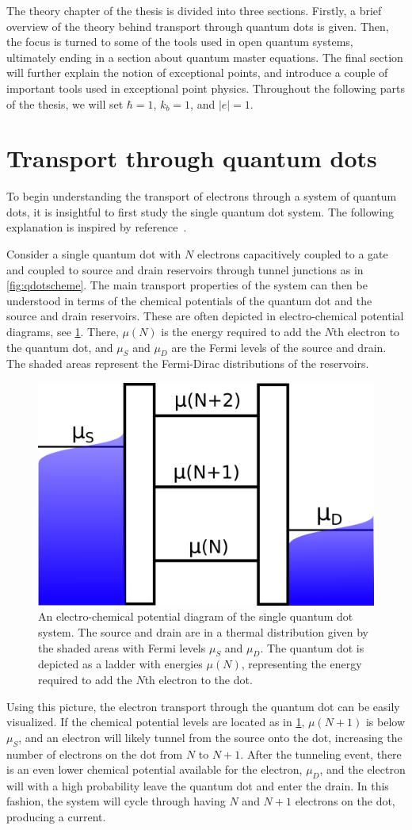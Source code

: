 \documentclass[../main.tex]{subfiles}
\begin{document}
The theory chapter of the thesis is divided into three sections. Firstly, a brief overview of the theory behind transport through quantum dots is given. Then, the focus is turned to some of the tools used in open quantum systems, ultimately ending in a section about quantum master equations. The final section will further explain the notion of exceptional points, and introduce a couple of important tools used in exceptional point physics. Throughout the following parts of the thesis, we will set $\hbar=1$, $k_b=1$, and $|e|=1$.

\section{Transport through quantum dots}
To begin understanding the transport of electrons through a system of quantum dots, it is insightful to first study the single quantum dot system. The following explanation is inspired by reference~\cite{transport}.

Consider a single quantum dot with $N$ electrons capacitively coupled to a gate and coupled to source and drain reservoirs through tunnel junctions as in \cref{fig:qdotscheme}. The main transport properties of the system can then be understood in terms of the chemical potentials of the quantum dot and the source and drain reservoirs. These are often depicted in electro-chemical potential diagrams, see \cref{fig:ladder}. There, $\mu(N)$ is the energy required to add the $N$th electron to the quantum dot, and $\mu_S$ and $\mu_D$ are the Fermi levels of the source and drain. The shaded areas represent the Fermi-Dirac distributions of the reservoirs.
\begin{figure}[H]
    \centering
    \includegraphics[width=0.5\linewidth]{figures/ladder.png}
    \caption{An electro-chemical potential diagram of the single quantum dot system. The source and drain are in a thermal distribution given by the shaded areas with Fermi levels $\mu_S$ and $\mu_D$. The quantum dot is depicted as a ladder with energies $\mu(N)$, representing the energy required to add the $N$th electron to the dot.}
    \label{fig:ladder}
\end{figure}
Using this picture, the electron transport through the quantum dot can be easily visualized. If the chemical potential levels are located as in \cref{fig:ladder}, $\mu(N + 1)$ is below $\mu_S$, and an electron will likely tunnel from the source onto the dot, increasing the number of electrons on the dot from $N$ to $N+1$. After the tunneling event, there is an even lower chemical potential available for the electron, $\mu_D$, and the electron will with a high probability leave the quantum dot and enter the drain. In this fashion, the system will cycle through having $N$ and $N+1$ electrons on the dot, producing a current.  
\end{document}
